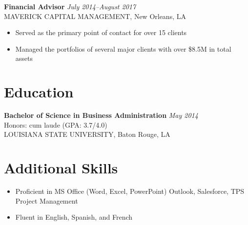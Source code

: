 \documentclass[11pt,letterpaper]{article}
\newcommand{\header}[1]{\textbf{\color{headercolor}#1}}
\begin{document}
\vspace{0.4em}
\header{Financial Advisor} \hfill \hfill \textit {July 2014--August 2017}\\
MAVERICK CAPITAL MANAGEMENT, New Orleans, LA
\begin{itemize}[leftmargin=2em,itemsep=0.3ex]
  \item Served as the primary point of contact for over 15 clients
  \item Managed the portfolios of several major clients with over \$8.5M in total assets
\end{itemize}
\vspace{0.3em}
\section*{Education}
\header{Bachelor of Science in Business Administration} \hfill \textit {May 2014}\\
Honors: cum laude (GPA: 3.7/4.0)\\
LOUISIANA STATE UNIVERSITY, Baton Rouge, LA
\vspace{0.3em}
\section*{Additional Skills}
\begin{itemize}[leftmargin=2em,itemsep=0.3ex]
  \item Proficient in MS Office (Word, Excel, PowerPoint) Outlook, Salesforce, TPS Project Management
  \item Fluent in English, Spanish, and French
\end{itemize}
\end{document}
